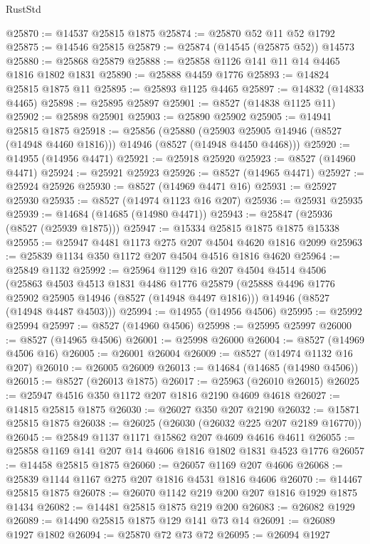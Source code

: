 \begin{lexlean}{RustStd}
\begin{coremodule}
@25870 := @14537 @25815 @1875
@25874 := @25870 @52 @11 @52 @1792
@25875 := @14546 @25815
@25879 := @25874 (@14545 (@25875 @52)) @14573
@25880 := @25868 @25879
@25888 := @25858 @1126 @141 @11 @14 @4465 @1816 @1802 @1831
@25890 := @25888 @4459 @1776
@25893 := @14824 @25815 @1875 @11
@25895 := @25893 @1125 @4465
@25897 := @14832 (@14833 @4465)
@25898 := @25895 @25897
@25901 := @8527 (@14838 @1125 @11)
@25902 := @25898 @25901
@25903 := @25890 @25902
@25905 := @14941 @25815 @1875
@25918 := @25856
    (@25880 (@25903 @25905 @14946 (@8527 (@14948 @4460 @1816))) @14946 (@8527 (@14948 @4450 @4468)))
@25920 := @14955 (@14956 @4471)
@25921 := @25918 @25920
@25923 := @8527 (@14960 @4471)
@25924 := @25921 @25923
@25926 := @8527 (@14965 @4471)
@25927 := @25924 @25926
@25930 := @8527 (@14969 @4471 @16)
@25931 := @25927 @25930
@25935 := @8527 (@14974 @1123 @16 @207)
@25936 := @25931 @25935
@25939 := @14684 (@14685 (@14980 @4471))
@25943 := @25847 (@25936 (@8527 (@25939 @1875)))
@25947 := @15334 @25815 @1875 @1875 @15338
@25955 := @25947 @4481 @1173 @275 @207 @4504 @4620 @1816 @2099
@25963 := @25839 @1134 @350 @1172 @207 @4504 @4516 @1816 @4620
@25964 := @25849 @1132
@25992 := @25964
    @1129
    @16
    @207
    @4504
    @4514
    @4506
    (@25863
      @4503
      @4513
      @1831
      @4486
      @1776
      @25879
      (@25888 @4496 @1776 @25902 @25905 @14946 (@8527 (@14948 @4497 @1816)))
      @14946
      (@8527 (@14948 @4487 @4503)))
@25994 := @14955 (@14956 @4506)
@25995 := @25992 @25994
@25997 := @8527 (@14960 @4506)
@25998 := @25995 @25997
@26000 := @8527 (@14965 @4506)
@26001 := @25998 @26000
@26004 := @8527 (@14969 @4506 @16)
@26005 := @26001 @26004
@26009 := @8527 (@14974 @1132 @16 @207)
@26010 := @26005 @26009
@26013 := @14684 (@14685 (@14980 @4506))
@26015 := @8527 (@26013 @1875)
@26017 := @25963 (@26010 @26015)
@26025 := @25947 @4516 @350 @1172 @207 @1816 @2190 @4609 @4618
@26027 := @14815 @25815 @1875
@26030 := @26027 @350 @207 @2190
@26032 := @15871 @25815 @1875
@26038 := @26025 (@26030 (@26032 @225 @207 @2189 @16770))
@26045 := @25849 @1137 @1171 @15862 @207 @4609 @4616 @4611
@26055 := @25858 @1169 @141 @207 @14 @4606 @1816 @1802 @1831 @4523 @1776
@26057 := @14458 @25815 @1875
@26060 := @26057 @1169 @207 @4606
@26068 := @25839 @1144 @1167 @275 @207 @1816 @4531 @1816 @4606
@26070 := @14467 @25815 @1875
@26078 := @26070 @1142 @219 @200 @207 @1816 @1929 @1875 @1434
@26082 := @14481 @25815 @1875 @219 @200
@26083 := @26082 @1929
@26089 := @14490 @25815 @1875 @129 @141 @73 @14
@26091 := @26089 @1927 @1802
@26094 := @25870 @72 @73 @72
@26095 := @26094 @1927

\end{coremodule}
\end{lexlean}
